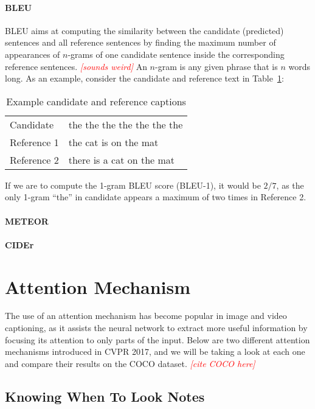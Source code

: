 \documentclass[10pt,twocolumn,letterpaper]{article}
\newcommand{\todo}[1]{\textcolor{red}{{\em [#1]}} }
\newcommand{\tabref}[1]{Table~\ref{tab:#1}}
\begin{document}
\paragraph{BLEU}
BLEU aims at computing the similarity between the candidate (predicted)
sentences and all reference sentences by finding the maximum number of
appearances of $n$-grams of one candidate sentence inside the corresponding
reference sentences.  \todo{sounds weird} An $n$-gram is any given phrase that
is $n$ words long. As an example, consider the candidate and reference text in
\tabref{captions}:
%
\begin{table}[]
\centering
\caption{Example candidate and reference captions}
\label{tab:captions}
\begin{tabular}{ll}
	Candidate   & the the the the the the the \\
	Reference 1 & the cat is on the mat       \\
	Reference 2 & there is a cat on the mat  
\end{tabular}
\end{table}
%
If we are to compute the 1-gram BLEU score (BLEU-1), it would be $2/7$, as the
only 1-gram ``the'' in candidate appears a maximum of two times in Reference
2.

\paragraph{METEOR}


\paragraph{CIDEr}

\section{Attention Mechanism}

The use of an attention mechanism has become popular in image and video
captioning, as it assists the neural network to extract more useful
information by focusing its attention to only parts of the input. Below are
two different attention mechanisms introduced in CVPR 2017, and we will be
taking a look at each one and compare their results on the COCO dataset.
\todo{cite COCO here}

\subsection{Knowing When To Look Notes}
\end{document}
